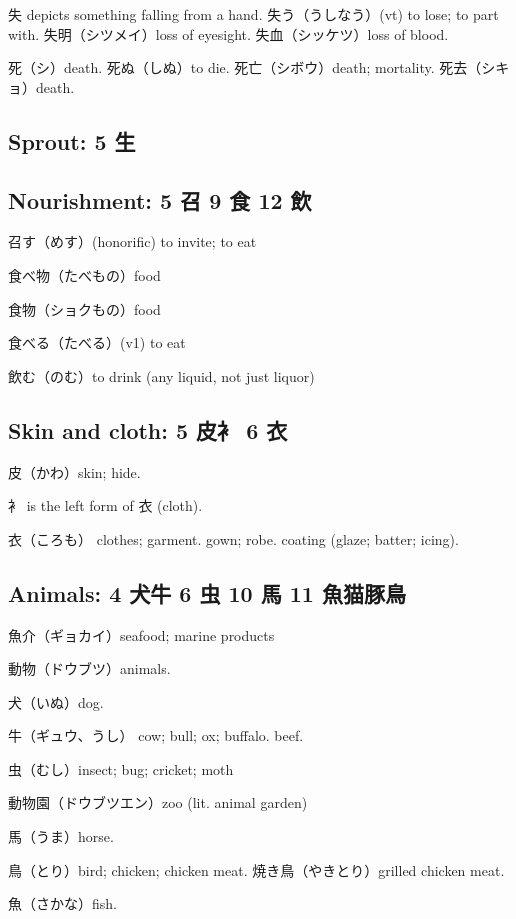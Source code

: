 失 depicts something falling from a hand.
失う（うしなう）(vt) to lose; to part with.
失明（シツメイ）loss of eyesight.
失血（シッケツ）loss of blood.

死（シ）death.
死ぬ（しぬ）to die.
死亡（シボウ）death; mortality.
死去（シキョ）death.

\subsection{Sprout: 5 生}

\subsection{Nourishment: 5 召 9 食 12 飲}

召す（めす）(honorific) to invite; to eat

食べ物（たべもの）food

食物（ショクもの）food

食べる（たべる）(v1) to eat

飲む（のむ）to drink (any liquid, not just liquor)

\subsection{Skin and cloth: 5 皮衤 6 衣}

皮（かわ）skin; hide.

衤 is the left form of 衣 (cloth).

衣（ころも）
clothes;
garment. gown;
robe. coating (glaze; batter; icing).

\subsection{Animals: 4 犬牛 6 虫 10 馬 11 魚猫豚鳥}

魚介（ギョカイ）seafood; marine products

動物（ドウブツ）animals.

犬（いぬ）dog.

牛（ギュウ、うし）
cow; bull; ox; buffalo.
beef.

虫（むし）insect; bug; cricket; moth

動物園（ドウブツエン）zoo (lit. animal garden)

馬（うま）horse.

鳥（とり）bird; chicken; chicken meat.
焼き鳥（やきとり）grilled chicken meat.

魚（さかな）fish.

